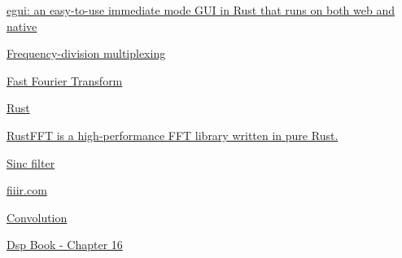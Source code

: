 \documentclass{article}
\begin{document}
\begin{thebibliography}{9}
    \href{https://github.com/emilk/egui}{egui: an easy-to-use immediate mode GUI in Rust that runs on both web and native}

    \href{https://en.wikipedia.org/wiki/Frequency-division_multiplexing}{Frequency-division multiplexing}

    \href{https://en.wikipedia.org/wiki/Fast_Fourier_transform}{Fast Fourier Transform}

    \href{https://rust-lang.org}{Rust}

    \href{https://docs.rs/rustfft/latest/rustfft/}{RustFFT is a high-performance FFT library written in pure Rust.}

    \href{https://en.wikipedia.org/wiki/Sinc_filter}{Sinc filter}

    \href{https://fiiir.com/}{fiiir.com}

    \href{https://en.wikipedia.org/wiki/Convolution}{Convolution}

    \href{https://www.analog.com/media/en/technical-documentation/dsp-book/dsp_book_Ch16.pdf}{Dsp Book - Chapter 16}
\end{thebibliography}
\end{document}
